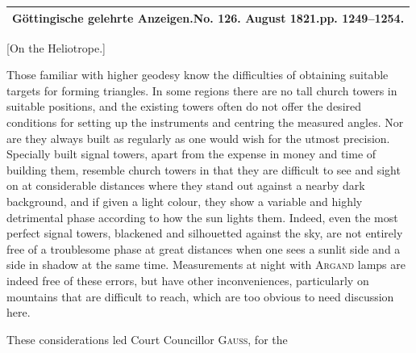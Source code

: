 \clearpage\null\vspace*{6.7cm}
\begin{center}{\fontsize{24}{30}\selectfont{}}\end{center}
\par\vspace*{11cm}\noindent\makebox[.86\linewidth][r]{58\textsuperscript{*}}\par
\clearpage\null
\clearpage\vspace*{2.7cm}
\begin{center}
\begin{tabular}{c}\hline
\small\textbf{Göttingische gelehrte Anzeigen.\quad No. 126.\quad 9 August 1821.\quad pp. 1249--1254.}\\\hline
\end{tabular}\par\bigskip
{\large [On the Heliotrope.]}
\end{center}
\par\noindent\hspace*{\parindent}Those familiar with higher geodesy know the difficulties of obtaining suitable targets for forming  triangles. In some regions there are no tall church towers in suitable positions, and the existing towers often do not offer the desired conditions for setting up the instruments and centring the measured angles. Nor are they always built as regularly as one would wish for the utmost precision. Specially built signal towers, apart from the expense in money and time of building them, resemble church towers in that they are difficult to see and sight on at considerable distances where they stand out against a nearby dark background, and if given a light colour, they show a variable and highly detrimental phase according to how the sun lights them. Indeed, even the most perfect signal towers, blackened and silhouetted against the sky, are not entirely free of a troublesome phase at  great distances when one sees a sunlit side and a side in shadow at the same time. Measurements at night with \textsc{Argand} lamps are indeed free of these errors, but have other inconveniences, particularly on mountains that are difficult to reach, which are too obvious to need discussion here.

\par\noindent\hspace*{\parindent}These considerations led Court Councillor \textsc{Gauss}, for the

